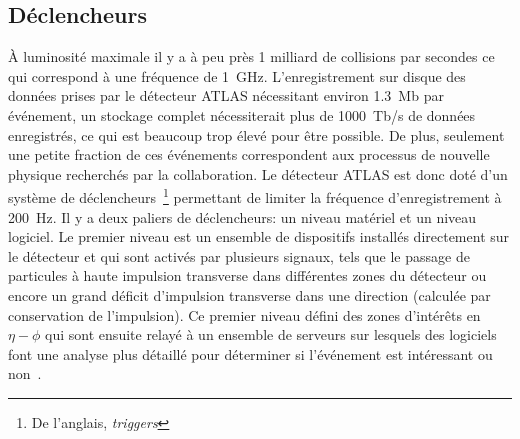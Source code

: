 \subsection{Déclencheurs}
\label{sec:lhc_atlas:atlas:daq}

À luminosité maximale il y a à peu près 1 milliard de collisions par
secondes ce qui correspond à une fréquence de 1~GHz. L'enregistrement
sur disque des données prises par le détecteur ATLAS nécessitant
environ 1.3~Mb par événement, un stockage complet nécessiterait plus
de 1000~Tb/s de données enregistrés, ce qui est beaucoup trop élevé
pour être possible. De plus, seulement une petite fraction de ces
événements correspondent aux processus de nouvelle physique recherchés
par la collaboration. Le détecteur ATLAS est donc doté d'un système de
déclencheurs~\footnote{De l'anglais, \emph{triggers}} permettant de
limiter la fréquence d'enregistrement à 200~Hz. Il y a deux paliers de
déclencheurs: un niveau matériel et un niveau logiciel. Le premier
niveau est un ensemble de dispositifs installés directement sur le
détecteur et qui sont activés par plusieurs signaux, tels que le
passage de particules à haute impulsion transverse dans différentes
zones du détecteur ou encore un grand déficit d'impulsion transverse
dans une direction (calculée par conservation de l'impulsion). Ce
premier niveau défini des zones d'intérêts en $\eta-\phi$ qui sont
ensuite relayé à un ensemble de serveurs sur lesquels des logiciels
font une analyse plus détaillé pour déterminer si l'événement est
intéressant ou non~\cite{collaboration_atlas_2008}.

